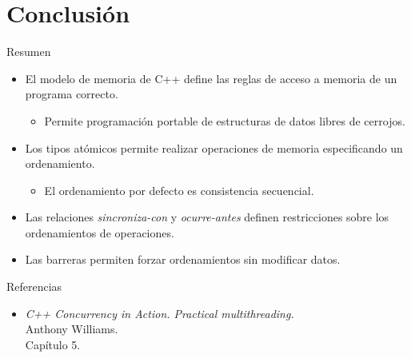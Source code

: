 \section{Conclusión}
\begin{frame}[t]{Resumen}
\begin{itemize}
  \item El modelo de memoria de C++ define las reglas de acceso a memoria
        de un programa correcto.
    \begin{itemize}
      \item Permite programación portable de estructuras de datos libres de cerrojos.
    \end{itemize}
  \item Los tipos atómicos permite realizar operaciones de memoria especificando un ordenamiento.
    \begin{itemize}
      \item El ordenamiento por defecto es consistencia secuencial.
    \end{itemize}
  \item Las relaciones \emph{sincroniza-con} y \emph{ocurre-antes} definen restricciones sobre los ordenamientos
        de operaciones.
  \item Las barreras permiten forzar ordenamientos sin modificar datos.
\end{itemize}
\end{frame}

\begin{frame}[t]{Referencias}
\begin{itemize}
  \item \emph{C++ Concurrency in Action. Practical multithreading.}\\
  Anthony Williams.\\
  Capítulo 5.
  
\end{itemize}
\end{frame}
